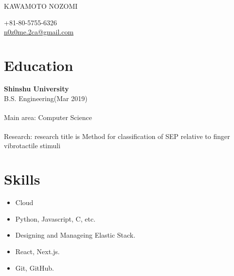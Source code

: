 \documentclass[10pt]{article} %
\begin{document}

\parbox[top][0.12\textheight][c]{\linewidth}{ %
	\vspace{-0.04\textheight} %
	{\color{name}\Huge KAWAMOTO NOZOMI}\\\medskip %
}

\begin{paracol}{2} %

{\faPhone} \hspace{1mm} +81-80-5755-6326 \\ %
{\small\faEnvelope} \hspace{1mm} \href{mailto:n0z0me.2ca@gmail.com}{\small n0z0me.2ca@gmail.com} \\ %

\vspace{3cm}

\section{\Large Education}
\textbf{\color{subtitle}\large Shinshu University}\\
B.S. Engineering(Mar 2019)\\
\\
Main area: Computer Science\\
\\
Research: research title is Method for classification of SEP relative to finger vibrotactile stimuli\\

\vspace{3cm}

\section{\Large Skills}
\begin{itemize}
\item Cloud
\item Python, Javascript, C, etc.
\item Designing and Manageing Elastic Stack.
\item React, Next.js.
\item Git, GitHub.
\end{itemize}


\end{paracol}
\end{document}
